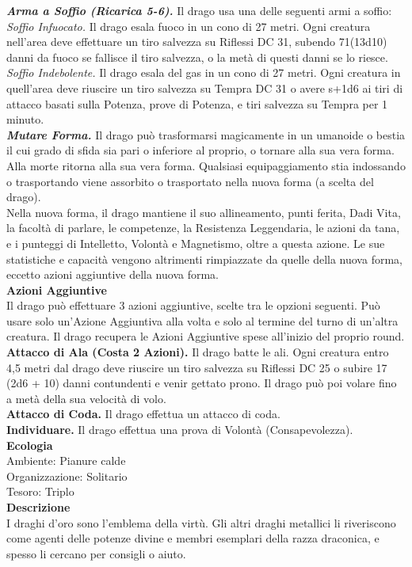 \begin{multicols}{2}
\emph{\textbf{Arma a Soffio (Ricarica 5-6).}} Il drago usa una delle seguenti armi a soffio:\\
\emph{Soffio Infuocato.} Il drago esala fuoco in un cono di 27 metri. Ogni creatura nell'area deve effettuare un tiro salvezza su Riflessi DC  31, subendo 71(13d10) danni da fuoco se fallisce il tiro salvezza, o la metà di questi danni se lo riesce.\\

\emph{Soffio Indebolente.} Il drago esala del gas in un cono di 27 metri. Ogni creatura in quell'area deve riuscire un tiro salvezza su Tempra DC  31 o avere s+1d6 ai tiri di attacco basati sulla Potenza, prove di Potenza, e tiri salvezza su Tempra per 1 minuto.\\
\emph{\textbf{Mutare Forma.}} Il drago può trasformarsi magicamente in un umanoide o bestia il cui grado di sfida sia pari o inferiore al proprio, o tornare alla sua vera forma. Alla morte ritorna alla sua vera forma. Qualsiasi equipaggiamento stia indossando o trasportando viene assorbito o trasportato nella nuova forma (a scelta del drago).\\
Nella nuova forma, il drago mantiene il suo allineamento, punti ferita, Dadi Vita, la facoltà di parlare, le competenze, la Resistenza Leggendaria, le azioni da tana, e i punteggi di Intelletto, Volontà e Magnetismo, oltre a questa azione. Le sue statistiche e capacità vengono altrimenti rimpiazzate da quelle della nuova forma, eccetto azioni aggiuntive della nuova forma.\\
\textbf{Azioni Aggiuntive}\\
Il drago può effettuare 3 azioni aggiuntive, scelte tra le opzioni seguenti. Può usare solo un'Azione Aggiuntiva alla volta e solo al termine del turno di un'altra creatura. Il drago recupera le Azioni Aggiuntive spese all'inizio del proprio round.\\

\textbf{Attacco di Ala (Costa 2 Azioni).} Il drago batte le ali. Ogni creatura entro 4,5 metri dal drago deve riuscire un tiro salvezza su Riflessi DC 25 o subire 17 (2d6 + 10) danni contundenti e venir gettato prono. Il drago può poi volare fino a metà della sua velocità di volo.\\
\textbf{Attacco di Coda.} Il drago effettua un attacco di coda.\\
\textbf{Individuare.} Il drago effettua una prova di Volontà (Consapevolezza).\\
\textbf{Ecologia}\\
Ambiente: Pianure calde\\
Organizzazione: Solitario\\
Tesoro: Triplo\\
\textbf{Descrizione}\\
I draghi d'oro sono l'emblema della virtù. Gli altri draghi metallici li riveriscono come agenti delle potenze divine e membri esemplari della razza draconica, e spesso li cercano per consigli o aiuto.\\


\end{multicols}
